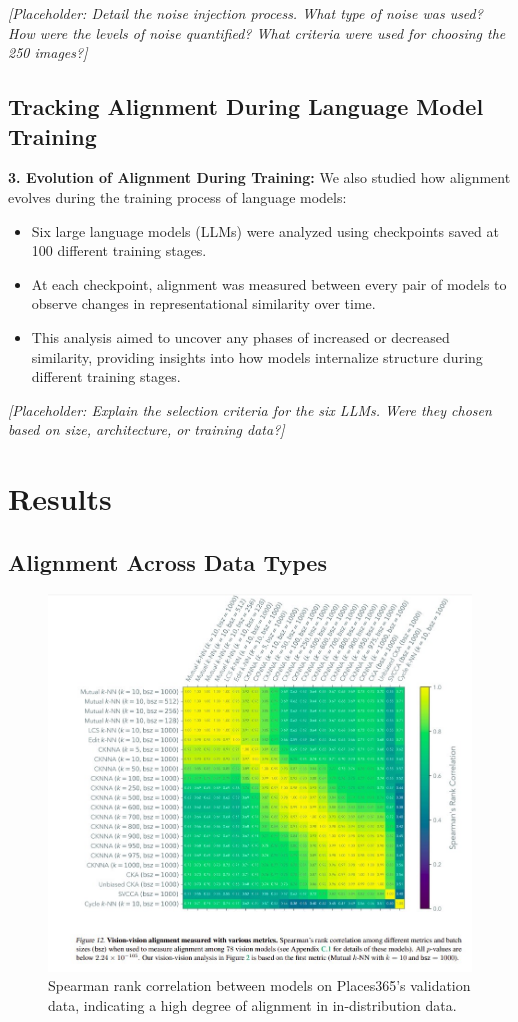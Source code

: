 \documentclass[10pt,a4paper]{article}
\begin{document}
\textit{[Placeholder: Detail the noise injection process. What type of noise was used? How were the levels of noise quantified? What criteria were used for choosing the 250 images?]}

\subsection{Tracking Alignment During Language Model Training}
\textbf{3. Evolution of Alignment During Training:} We also studied how alignment evolves during the training process of language models:
\begin{itemize}
    \item Six large language models (LLMs) were analyzed using checkpoints saved at 100 different training stages.
    \item At each checkpoint, alignment was measured between every pair of models to observe changes in representational similarity over time.
    \item This analysis aimed to uncover any phases of increased or decreased similarity, providing insights into how models internalize structure during different training stages.
\end{itemize}

\textit{[Placeholder: Explain the selection criteria for the six LLMs. Were they chosen based on size, architecture, or training data?]}

\section{Results}
\subsection{Alignment Across Data Types}
\begin{figure}[H]
    \centering
    \includegraphics[width=\textwidth]{prh_correlation.jpg}
    \caption{Spearman rank correlation between models on Places365's validation data, indicating a high degree of alignment in in-distribution data.}
    \label{fig:prh_correlation}
\end{figure}
\end{document}
